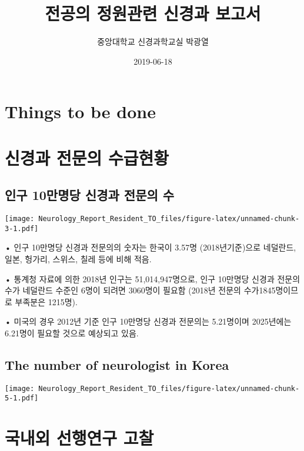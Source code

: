 \documentclass[]{book}
\title{전공의 정원관련 신경과 보고서}
\author{중앙대학교 신경과학교실 박광열}
\date{2019-06-18}
\begin{document}
\maketitle

{
\setcounter{tocdepth}{1}
\tableofcontents
}
\hypertarget{things-to-be-done}{%
\chapter*{Things to be done}\label{things-to-be-done}}

\hypertarget{DemandSupplyNeurologist}{%
\chapter{신경과 전문의 수급현황}\label{DemandSupplyNeurologist}}

\hypertarget{section}{%
\section{인구 10만명당 신경과 전문의 수}\label{section}}

\texttt{[image: Neurology\_Report\_Resident\_TO\_files/figure-latex/unnamed-chunk-3-1.pdf]}

• 인구 10만명당 신경과 전문의의 숫자는 한국이 3.57명 (2018년기준)으로 네덜란드, 일본, 헝가리, 스위스, 칠레 등에 비해 적음.

• 통계청 자료에 의한 2018년 인구는 51,014,947명으로, 인구 10만명당 신경과 전문의 수가 네덜란드 수준인 6명이 되려면 3060명이 필요함 (2018년 전문의 수가1845명이므로 부족분은 1215명).

• 미국의 경우 2012년 기준 인구 10만명당 신경과 전문의는 5.21명이며 2025년에는 6.21명이 필요할 것으로 예상되고 있음.

\hypertarget{the-number-of-neurologist-in-korea}{%
\section{The number of neurologist in Korea}\label{the-number-of-neurologist-in-korea}}

\texttt{[image: Neurology\_Report\_Resident\_TO\_files/figure-latex/unnamed-chunk-5-1.pdf]}

\hypertarget{section-1}{%
\chapter{국내외 선행연구 고찰}\label{section-1}}
\end{document}
